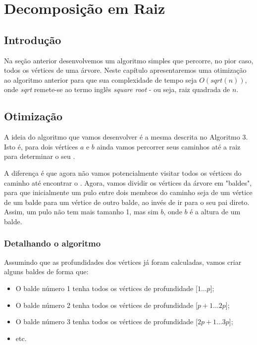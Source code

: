 \chapter{Decomposição em Raiz}
\label{cap:decomp-raiz}

\section{Introdução}

Na seção anterior desenvolvemos um algoritmo simples que percorre, no pior caso, todos os vértices de uma árvore. Neste capítulo apresentaremos uma otimização ao algoritmo anterior para que sua complexidade de tempo seja $O(sqrt(n))$, onde \textit{sqrt} remete-se ao termo inglês \textit{square root} - ou seja, raiz quadrada de $n$.

\section{Otimização}

A ideia do algoritmo que vamos desenvolver é a mesma descrita no Algoritmo 3. Isto é, para dois vértices $a$ e $b$ ainda vamos percorrer seus caminhos até a raiz para determinar o seu \LCA.

A diferença é que agora não vamos potencialmente visitar todos os vértices do caminho até encontrar o \LCA. Agora, vamos dividir os vértices da árvore em "baldes", para que inicialmente um pulo entre dois membros do caminho seja de um vértice de um balde para um vértice de outro balde, ao invés de ir para o seu pai direto. Assim, um pulo não tem mais tamanho 1, mas sim $b$, onde $b$ é a altura de um balde.

\subsection{Detalhando o algoritmo}

Assumindo que as profundidades dos vértices já foram calculadas, vamos criar alguns baldes de forma que:

\begin{itemize}
    \item O balde número 1 tenha todos os vértices de profundidade [$1$...$p$];
    \item O balde número 2 tenha todos os vértices de profundidade [$p+1$...$2p$];
    \item O balde número 3 tenha todos os vértices de profundidade [$2p+1$...$3p$];
    \item etc.
\end{itemize}

